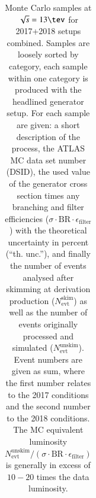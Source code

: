\begin{table}[htbp]
\begin{center}
\begin{tabular}{l|l|l|l|l}
\hline
   \end{tabular}
   \caption{Monte Carlo samples at $\sqrt{s} = 13\tev$ for 2017+2018
     setups combined. Samples are loosely sorted by category, each
     sample within one category is produced with the headlined
     generator setup. For each sample are given: a short description
     of the process, the ATLAS MC data set number (DSID), the used
     value of the generator cross section times any branching and
     filter efficiencies
     ($\sigma{\cdot} \text{BR}{\cdot}\epsilon_\mathrm{filter}$) with
     the theoretical uncertainty in percent (``th. unc.''), and
     finally the number of events analysed after skimming at
     derivation production ($N^\mathrm{skim}_\mathrm{evt}$) as well as
     the number of events originally processed and simulated
     ($N^\mathrm{unskim}_\mathrm{evt}$). Event numbers are given as sum, where the first number relates to the 2017 conditions and the second number to the 2018 conditions. The MC equivalent luminosity
     $N^\mathrm{unskim}_\mathrm{evt}/(\sigma{\cdot}\text{BR}{\cdot}\epsilon_\mathrm{filter})$
     is generally in excess of $10-20$ times the data luminosity.}
    \label{tab:samples13}
  \end{center}
\end{table}

